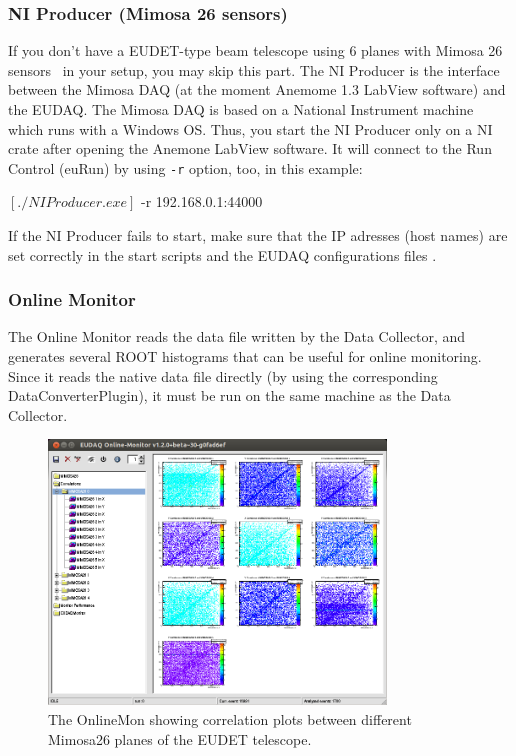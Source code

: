 \subsubsection{NI Producer (Mimosa 26 sensors)}
\label{sec:niproducer}

If you don't have a EUDET-type beam telescope using 6 planes with Mimosa 26 sensors~\cite{Jansen:2016} in your setup, you may skip this part.
The NI Producer is the interface between the Mimosa DAQ (at the moment Anemome 1.3 LabView software) and the EUDAQ. 
The Mimosa DAQ is based on a National Instrument machine which runs with a Windows OS. 
Thus, you start the NI Producer only on a NI crate after opening the Anemone LabView software.
It will connect to the Run Control (euRun) by using \texttt{-r} option, too, in this example:
\begin{listing}[mybash]
$[./NIProducer.exe]$ -r 192.168.0.1:44000
\end{listing}
If the NI Producer fails to start, make sure that the IP adresses (host names) are set correctly in the start scripts and the EUDAQ configurations files \cite[section 5.2.1.2 1.]{telescopesWikiUserManual}.


\subsubsection{Online Monitor}
\label{sec:onlinemonitor}
The Online Monitor reads the data file written by the Data Collector,
and generates several ROOT histograms that can be useful for online monitoring.
Since it reads the native data file directly (by using the corresponding DataConverterPlugin), it must be run on the same machine as the Data Collector.

\begin{figure}[htb]
  \begin{center}
    \includegraphics[width=0.8\textwidth]{src/images/OnlineMonCorrelations}
    \caption{The OnlineMon showing correlation plots between different
      Mimosa26 planes of the EUDET telescope.}
    \label{fig:OnlineMonPlots}
  \end{center}
\end{figure}

